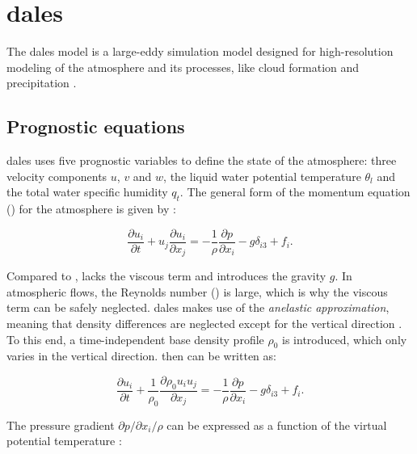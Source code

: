 \section{\acrshort{dales}}
The \acrfull{dales} model is a large-eddy simulation model designed for high-resolution modeling of the atmosphere and its processes, like cloud formation and precipitation \citep{heusFormulationDutchAtmospheric2010,ouwerslootLargeEddySimulationComparison2017}. 

\subsection{Prognostic equations}
\acrshort{dales} uses five prognostic variables to define the state of the atmosphere: three velocity components $u$, $v$ and $w$, the liquid water potential temperature $\theta_l$ and the total water specific humidity $q_t$. The general form of the momentum equation () for the atmosphere is given by \citep{stullIntroductionBoundaryLayer1988}:

\begin{equation}
    \frac{\partial u_i}{\partial t} + u_j \frac{\partial u_i}{\partial x_j} = - \frac{1}{\rho} \frac{\partial p}{\partial x_i} - g \delta_{i3} + f_i. \label{eq:momentum_atmos}
\end{equation}

Compared to ,  lacks the viscous term and introduces the gravity $g$. In atmospheric flows, the Reynolds number () is large, which is why the viscous term can be safely neglected. \acrshort{dales} makes use of the \emph{anelastic approximation}, meaning that density differences are neglected except for the vertical direction \citep{boingInteractionDeepConvective2014}. To this end, a time-independent base density profile $\rho_0$ is introduced, which only varies in the vertical direction.  then can be written as:

\begin{equation}
    \frac{\partial u_i}{\partial t} + \frac{1}{\rho_0} \frac{\partial \rho_0 u_i u_j}{\partial x_j} = - \frac{1}{\rho} \frac{\partial p}{\partial x_i} - g \delta_{i3} + f_i. \label{eq:momentum_atmos_rho0}
\end{equation}

The pressure gradient $\partial p / \partial x_i / \rho$ can be expressed as a function of the virtual potential temperature \citep{boingInteractionDeepConvective2014}:

